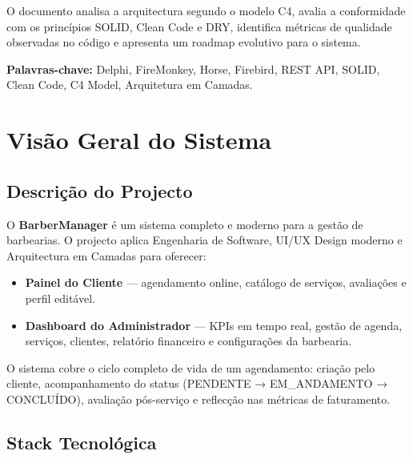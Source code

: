 \documentclass[12pt,a4paper]{article}
\begin{document}
O documento analisa a arquitectura segundo o modelo C4, avalia a conformidade com os princípios SOLID, Clean Code e DRY, identifica métricas de qualidade observadas no código e apresenta um roadmap evolutivo para o sistema.

\textbf{Palavras-chave:} Delphi, FireMonkey, Horse, Firebird, REST API, SOLID, Clean Code, C4 Model, Arquitetura em Camadas.

\newpage
\tableofcontents

\newpage
\section{Visão Geral do Sistema}

\subsection{Descrição do Projecto}

O \textbf{BarberManager} é um sistema completo e moderno para a gestão de barbearias. O projecto aplica Engenharia de Software, UI/UX Design moderno e Arquitectura em Camadas para oferecer:

\begin{itemize}
  \item \textbf{Painel do Cliente} — agendamento online, catálogo de serviços, avaliações e perfil editável.
  \item \textbf{Dashboard do Administrador} — KPIs em tempo real, gestão de agenda, serviços, clientes, relatório financeiro e configurações da barbearia.
\end{itemize}

O sistema cobre o ciclo completo de vida de um agendamento: criação pelo cliente, acompanhamento do status (PENDENTE → EM\_ANDAMENTO → CONCLUÍDO), avaliação pós-serviço e reflecção nas métricas de faturamento.

\subsection{Stack Tecnológica}
\end{document}
